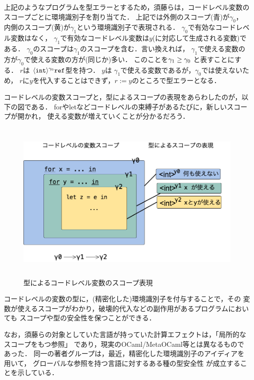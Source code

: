 上記のようなプログラムを型エラーとするため，須藤らは，コードレベル変数の
スコープごとに環境識別子を割り当てた．
上記では外側のスコープ(青)が$\gamma_0$，
内側のスコープ(黄)が$\gamma_1$という環境識別子で表現される．
$\gamma_0$で有効なコードレベル変数はなく，
$\gamma_1$で有効なコードレベル変数は$y$(に対応して生成される変数)である．
$\gamma_0$のスコープは$\gamma_1$のスコープを含む．言い換えれば，
$\gamma_1$で使える変数の方が$\gamma_0$で使える変数の方が(同じか)多い．
このことを$\gamma_1 \ge \gamma_0$ と表すことにする．
$r$は $\langle{\mbox{\texttt{int}}}\rangle^{\gamma_0} \mbox{\texttt{ref}}$型を持つ．
$y$は $\gamma_1$で使える変数であるが，$\gamma_0$では使えないため，
$r$に$y$を代入することはできず，$r:=y$のところで型エラーとなる．

コードレベルの変数スコープと，型によるスコープの表現をあらわしたのが，以下の図である．
forやletなどコードレベルの束縛子があるたびに，新しいスコープが開かれ，
使える変数が増えていくことが分かるだろう．

\begin{figure}[ht]
  \centering
  \includegraphics[clip,height=8cm]{./img/ec_for.png}
  \caption{型によるコードレベル変数のスコープ表現}
  \label{fig:ec_for}
\end{figure}

コードレベルの変数の型に，(精密化した)環境識別子を付与することで，その
変数が使えるスコープがわかり，破壊的代入などの副作用があるプログラムにおいても
スコープや型の安全性を保つことができる．

なお，須藤らの対象としていた言語が持っていた計算エフェクトは，「局所的なスコープをもつ参照」
であり，現実のOCaml/MetaOCaml等とは異なるものであった．
同一の著者グループは，最近，精密化した環境識別子のアイディアを用いて，
グローバルな参照を持つ言語に対するある種の型安全性
が成立することを示している\cite{Aplas2016}．

